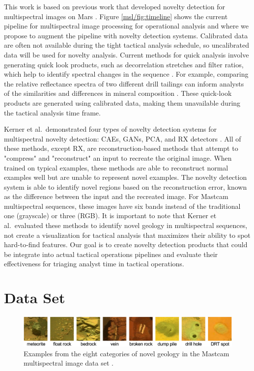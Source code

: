 This work is based on previous work that developed novelty detection for multispectral images on Mars \parencite{kerner2020comparison}.
Figure \ref{msl/fig:timeline} shows the current pipeline for multispectral image processing for operational analysis and where we propose to augment the pipeline with novelty detection systems. 
Calibrated data are often not available during the tight tactical analysis schedule, so uncalibrated data will be used for novelty analysis. 
Current methods for quick analysis involve generating quick look products, such as decorrelation stretches and filter ratios, which help to identify spectral changes in the sequence \parencite{gillespie1986color}.
For example, comparing the relative reflectance spectra of two different drill tailings can inform analysts of the similarities and differences in mineral composition \parencite{wellington2017visible}.
These quick-look products are generated using calibrated data, making them unavailable during the tactical analysis time frame.  

Kerner et al.~demonstrated four types of novelty detection systems for multispectral novelty detection: CAEs, GANs, PCA, and RX detectors \parencite{kerner2020comparison}. 
All of these methods, except RX, are reconstruction-based methods that attempt to "compress" and "reconstruct" an input to recreate the original image. 
When trained on typical examples, these methods are able to reconstruct normal examples well but are unable to represent novel examples.
The novelty detection system is able to identify novel regions based on the reconstruction error, known as the difference between the input and the recreated image.
For Mastcam multispectral sequences, these images have six bands instead of the traditional one (grayscale) or three (RGB). 
It is important to note that Kerner et al.~evaluated these methods to identify novel geology in multispectral sequences, not create a visualization for tactical analysis that maximizes their ability to spot hard-to-find features. 
Our goal is to create novelty detection products that could be integrate into actual tactical operations pipelines and evaluate their effectiveness for triaging analyst time in tactical operations.

\section{Data Set}
\begin{figure}
\centering
\includegraphics[width=\linewidth]{figs/msl/categories.png}
\caption[Novel Geology Categories for Mastcam Multispectral Images]{Examples from the eight categories of novel geology in the Mastcam multispectral image data set \protect\parencite{kerner_data}.}
\label{msl/fig:NovelCategories}
\end{figure}

